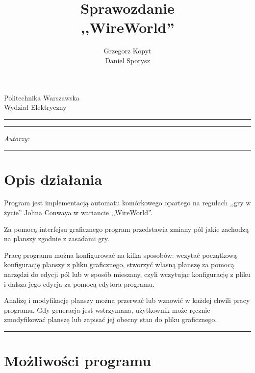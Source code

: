 \documentclass[a4paper,11pt]{article}
\author{Grzegorz Kopyt\\
Daniel Sporysz}
\title{Sprawozdanie\\
,,WireWorld''}
\makeatletter
\newcommand{\linia}{\rule{\linewidth}{0.4mm}}
\renewcommand{\maketitle}{\begin{titlepage}
    \vspace*{2cm}
    \begin{center}\LARGE
    Politechnika Warszawska\\
    Wydział Elektryczny\\
    \end{center}
    \vspace{5cm}
    \noindent\linia
    \begin{center}
      \LARGE \textsc{\@title}
         \end{center}
     \linia
    \vspace{0.5cm}
    \begin{flushright}
    \begin{minipage}{5cm}
    \textit{Autorzy:}\\
    \normalsize \textsc{\@author} \par
    \end{minipage}
    \vspace{5cm}
     \end{flushright}
    \vspace*{\stretch{6}}
    \begin{center}
    \@date
    \end{center}
  \end{titlepage}%
}
\makeatother
\begin{document}
\maketitle


\tableofcontents
\vspace{1cm}
\noindent\linia



\section{Opis działania}
Program jest implementacją automatu komórkowego opartego na regułach ,,gry w życie'' Johna Conwaya w wariancie ,,WireWorld''.

Za pomocą interfejsu graficznego program przedstawia zmiany pól jakie zachodzą na planszy zgodnie z zasadami gry.

Pracę programu można konfigurować na kilka sposobów: wczytać początkową konfigurację planszy z pliku graficznego, stworzyć własną planszę za pomocą narzędzi do edycji pól lub w sposób mieszany, czyli wczytując konfigurację z pliku i dalsza jego edycja za pomocą edytora programu.

Analizę i modyfikację planszy można przerwać lub wznowić w każdej chwili pracy programu. Gdy generacja jest wstrzymana, użytkownik może ręcznie zmodyfikować planszę lub zapisać jej obecny stan do pliku graficznego.

\noindent\linia
\section{Możliwości programu}
\end{document}
